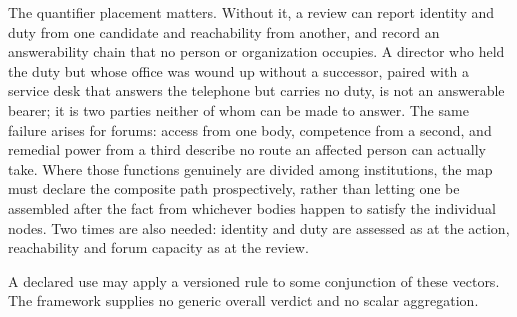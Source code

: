 The quantifier placement matters. Without it, a review can report identity and duty from one candidate and reachability from another, and record an answerability chain that no person or organization occupies. A director who held the duty but whose office was wound up without a successor, paired with a service desk that answers the telephone but carries no duty, is not an answerable bearer; it is two parties neither of whom can be made to answer. The same failure arises for forums: access from one body, competence from a second, and remedial power from a third describe no route an affected person can actually take. Where those functions genuinely are divided among institutions, the map must declare the composite path prospectively, rather than letting one be assembled after the fact from whichever bodies happen to satisfy the individual nodes. Two times are also needed: identity and duty are assessed as at the action, reachability and forum capacity as at the review.

A declared use may apply a versioned rule to some conjunction of these vectors. The framework supplies no generic overall verdict and no scalar aggregation.

